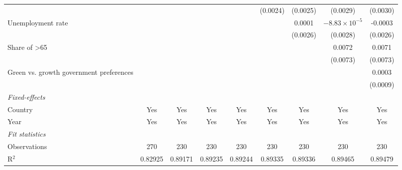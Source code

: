 \begin{table}[htbp]
\begin{tabular}{lcccccccc}
                                                                       &          &                &                &               & (0.0024) & (0.0025) & (0.0029)               & (0.0030)\\   
      Unemployment rate                                                &          &                &                &               &          & 0.0001   & $-8.83\times 10^{-5}$  & -0.0003\\   
                                                                       &          &                &                &               &          & (0.0026) & (0.0028)               & (0.0026)\\   
      Share of >65                                                     &          &                &                &               &          &          & 0.0072                 & 0.0071\\   
                                                                       &          &                &                &               &          &          & (0.0073)               & (0.0073)\\   
      Green vs. growth government preferences                          &          &                &                &               &          &          &                        & 0.0003\\   
                                                                       &          &                &                &               &          &          &                        & (0.0009)\\   
      \midrule
      \emph{Fixed-effects}\\
      Country                                                          & Yes      & Yes            & Yes            & Yes           & Yes      & Yes      & Yes                    & Yes\\  
      Year                                                             & Yes      & Yes            & Yes            & Yes           & Yes      & Yes      & Yes                    & Yes\\  
      \midrule
      \emph{Fit statistics}\\
      Observations                                                     & 270      & 230            & 230            & 230           & 230      & 230      & 230                    & 230\\  
      R$^2$                                                            & 0.82925  & 0.89171        & 0.89235        & 0.89244       & 0.89335  & 0.89336  & 0.89465                & 0.89479\\  

\end{tabular}
\end{table}
